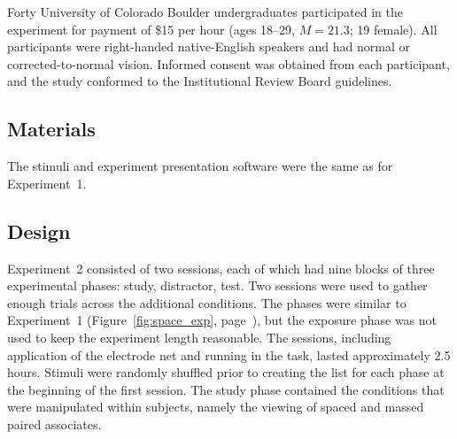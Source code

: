 
Forty University of Colorado Boulder undergraduates participated in the experiment for payment of \$15 per hour (ages 18--29, $M=21.3$; 19 female).  All participants were right-handed native-English speakers and had normal or corrected-to-normal vision.  Informed consent was obtained from each participant, and the study conformed to the Institutional Review Board guidelines.

\subsection{Materials}

The stimuli and experiment presentation software were the same as for Experiment~1.

\subsection{Design}


Experiment~2 consisted of two sessions, each of which had nine blocks of three experimental phases: study, distractor, test.
\cbstart
Two sessions were used to gather enough trials across the additional conditions.
\cbend
The phases were similar to Experiment~1 (Figure~\ref{fig:space_exp}, page~\pageref{fig:space_exp}), but the exposure phase was not used to keep the experiment length reasonable.
The sessions, including application of the electrode net and running in the task, lasted approximately 2.5 hours.  Stimuli were randomly shuffled prior to creating the list for each phase at the beginning of the first session.  The study phase contained the conditions that were manipulated within subjects, namely the viewing of spaced and massed paired associates.

